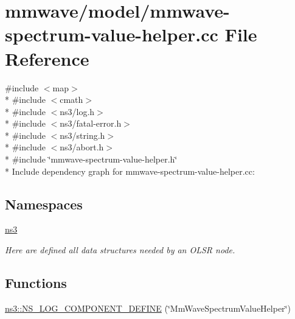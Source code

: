 \hypertarget{mmwave-spectrum-value-helper_8cc}{}\section{mmwave/model/mmwave-\/spectrum-\/value-\/helper.cc File Reference}
\label{mmwave-spectrum-value-helper_8cc}
{\ttfamily \#include $<$map$>$}\\*
{\ttfamily \#include $<$cmath$>$}\\*
{\ttfamily \#include $<$ns3/log.\+h$>$}\\*
{\ttfamily \#include $<$ns3/fatal-\/error.\+h$>$}\\*
{\ttfamily \#include $<$ns3/string.\+h$>$}\\*
{\ttfamily \#include $<$ns3/abort.\+h$>$}\\*
{\ttfamily \#include \char`\"{}mmwave-\/spectrum-\/value-\/helper.\+h\char`\"{}}\\*
Include dependency graph for mmwave-\/spectrum-\/value-\/helper.cc\+:
\subsection*{Namespaces}
\begin{DoxyCompactItemize}
\item 
 \hyperlink{namespacens3}{ns3}
\begin{DoxyCompactList}\small\item\em Here are defined all data structures needed by an O\+L\+SR node. \end{DoxyCompactList}\end{DoxyCompactItemize}
\subsection*{Functions}
\begin{DoxyCompactItemize}
\item 
\hyperlink{namespacens3_a3e0cff13aa49aac3f0ffa6fdfa1fabd6}{ns3\+::\+N\+S\+\_\+\+L\+O\+G\+\_\+\+C\+O\+M\+P\+O\+N\+E\+N\+T\+\_\+\+D\+E\+F\+I\+NE} (\char`\"{}Mm\+Wave\+Spectrum\+Value\+Helper\char`\"{})
\end{DoxyCompactItemize}
